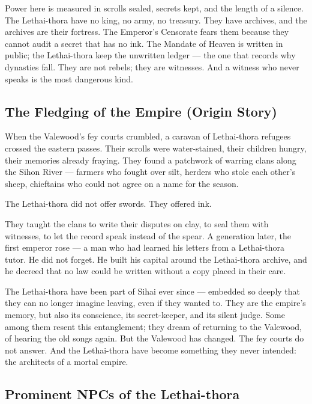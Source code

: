 Power here is measured in scrolls sealed, secrets kept, and the length of a silence. The Lethai-thora have no king, no army, no treasury. They have archives, and the archives are their fortress. The Emperor's Censorate fears them because they cannot audit a secret that has no ink. The Mandate of Heaven is written in public; the Lethai-thora keep the unwritten ledger --- the one that records why dynasties fall. They are not rebels; they are witnesses. And a witness who never speaks is the most dangerous kind.

\subsection*{The Fledging of the Empire (Origin Story)}
\label{sec:lethai-thora-origin}

When the Valewood's fey courts crumbled, a caravan of Lethai-thora refugees crossed the eastern passes. Their scrolls were water-stained, their children hungry, their memories already fraying. They found a patchwork of warring clans along the Sihon River --- farmers who fought over silt, herders who stole each other's sheep, chieftains who could not agree on a name for the season.

The Lethai-thora did not offer swords. They offered ink.

They taught the clans to write their disputes on clay, to seal them with witnesses, to let the record speak instead of the spear. A generation later, the first emperor rose --- a man who had learned his letters from a Lethai-thora tutor. He did not forget. He built his capital around the Lethai-thora archive, and he decreed that no law could be written without a copy placed in their care.

The Lethai-thora have been part of Sihai ever since --- embedded so deeply that they can no longer imagine leaving, even if they wanted to. They are the empire's memory, but also its conscience, its secret-keeper, and its silent judge. Some among them resent this entanglement; they dream of returning to the Valewood, of hearing the old songs again. But the Valewood has changed. The fey courts do not answer. And the Lethai-thora have become something they never intended: the architects of a mortal empire.

\subsection*{Prominent NPCs of the Lethai-thora}
\label{sec:lethai-thora-npcs}

